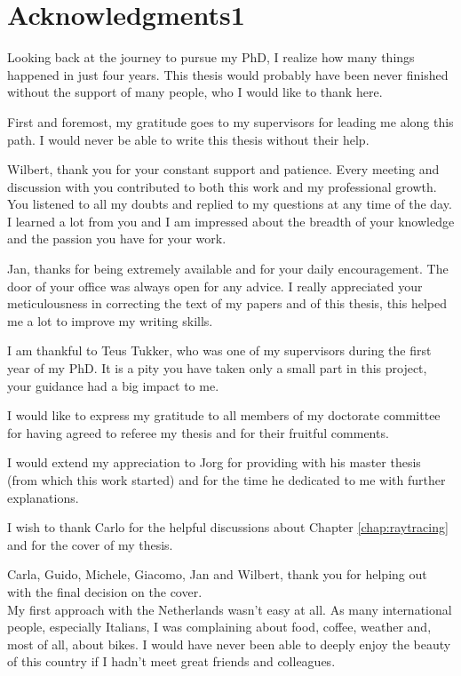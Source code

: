 \chapter*{Acknowledgments1}
Looking back at the journey to pursue my PhD, I realize how many things happened in just four years. This thesis would probably have been never finished without the support of many people, who I would like to thank here.  

First and foremost, my gratitude goes to my supervisors for leading me along this path. I would never be able to write this thesis without their help.

Wilbert, thank you for your constant support and patience. Every meeting and discussion with you contributed to both this work and my professional growth. 
You listened to all my doubts and replied to my questions at any time of the day.
I learned a lot from you and I am impressed about the breadth of your knowledge and the passion you have for your work. 

Jan, thanks for being extremely available and for your daily encouragement. The door of your office was always open for any advice. 
I really appreciated your meticulousness in correcting the text of my papers and of this thesis, this helped me a lot to improve my writing skills.

I am thankful to Teus Tukker, who was one of my supervisors during the first year of my PhD. It is a pity you have taken only a small part in this project, your guidance had a big impact to me.

I would like to express my gratitude to all members of my doctorate committee for having agreed to referee my thesis and for their fruitful comments.  

I would extend my appreciation to Jorg for providing with his master thesis (from which this work started) and for the time he dedicated to me with further explanations.

I wish to thank Carlo for the helpful discussions about Chapter \ref{chap:raytracing} and for the cover of my thesis. 

Carla, Guido, Michele, Giacomo, Jan and Wilbert, thank you for helping out with the final decision on the cover. \\

My first approach with the Netherlands wasn't easy at all. As many international people, especially Italians, I was complaining about food, coffee, weather and, most of all, about bikes. 
I would have never been able to deeply enjoy the beauty of this country if I hadn't meet great friends and colleagues.

